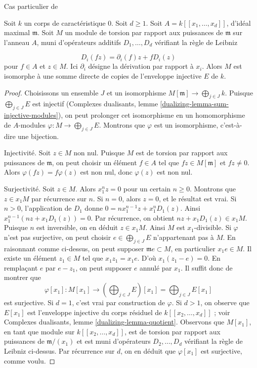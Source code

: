 \begin{lemma}
\label{lemma-structure-torsion-D-module-regular}
\begin{reference}
Cas particulier de \cite[Theorem 2.4]{Lyubeznik}
\end{reference}
Soit $k$ un corps de caractéristique $0$. Soit $d \geq 1$. Soit $A = k[[x_1, \ldots, x_d]]$, d'idéal maximal $\mathfrak m$. Soit $M$ un module de torsion par rapport aux puissances de $\mathfrak m$ sur l'anneau $A$, muni d'opérateurs additifs $D_1, \ldots, D_d$ vérifiant la règle de Leibniz

$$
D_i(fz) = \partial_i(f) z + f D_i(z)
$$
pour $f \in A$ et $z \in M$. Ici $\partial_i$ désigne la dérivation par rapport à $x_i$. Alors $M$ est isomorphe à une somme directe de copies de l'enveloppe injective $E$ de $k$.
\end{lemma}

\begin{proof}
Choisissons un ensemble $J$ et un isomorphisme $M[\mathfrak m] \to \bigoplus_{j \in J} k$. Puisque $\bigoplus_{j \in J} E$ est injectif (Complexes dualisants, lemme \ref{dualizing-lemma-sum-injective-modules}), on peut prolonger cet isomorphisme en un homomorphisme de $A$-modules $\varphi : M \to \bigoplus_{j \in J} E$. Montrons que $\varphi$ est un isomorphisme, c'est-à-dire une bijection.

\medskip\noindent
Injectivité. Soit $z \in M$ non nul. Puisque $M$ est de torsion par rapport aux puissances de $\mathfrak m$, on peut choisir un élément $f \in A$ tel que $fz \in M[\mathfrak m]$ et $fz \not = 0$. Alors $\varphi(fz) = f\varphi(z)$ est non nul, donc $\varphi(z)$ est non nul.

\medskip\noindent
Surjectivité. Soit $z \in M$. Alors $x_1^n z = 0$ pour un certain $n \geq 0$. Montrons que $z \in x_1M$ par récurrence sur $n$. Si $n = 0$, alors $z = 0$, et le résultat est vrai. Si $n > 0$, l'application de $D_1$ donne $0 = n x_1^{n - 1} z + x_1^nD_1(z)$. Ainsi $x_1^{n - 1}(nz + x_1D_1(z)) = 0$. Par récurrence, on obtient $nz + x_1D_1(z) \in x_1M$. Puisque $n$ est inversible, on en déduit $z \in x_1M$. Ainsi $M$ est $x_1$-divisible. Si $\varphi$ n'est pas surjective, on peut choisir $e \in \bigoplus_{j \in J} E$ n'appartenant pas à $M$. En raisonnant comme ci-dessus, on peut supposer $\mathfrak m e \subset M$, en particulier $x_1 e \in M$. Il existe un élément $z_1 \in M$ tel que $x_1 z_1 = x_1 e$. D'où $x_1(z_1 - e) = 0$. En remplaçant $e$ par $e - z_1$, on peut supposer $e$ annulé par $x_1$. Il suffit donc de montrer que
$$
\varphi[x_1] :
M[x_1]
\longrightarrow
\left(\bigoplus\nolimits_{j \in J} E\right)[x_1] =
\bigoplus\nolimits_{j \in J} E[x_1]
$$
est surjective. Si $d = 1$, c'est vrai par construction de $\varphi$. Si $d > 1$, on observe que $E[x_1]$ est l'enveloppe injective du corps résiduel de $k[[x_2, \ldots, x_d]]$ ; voir Complexes dualisants, lemme \ref{dualizing-lemma-quotient}. Observons que $M[x_1]$, en tant que module sur $k[[x_2, \ldots, x_d]]$, est de torsion par rapport aux puissances de $\mathfrak m/(x_1)$ et est muni d'opérateurs $D_2, \ldots, D_d$ vérifiant la règle de Leibniz ci-dessus. Par récurrence sur $d$, on en déduit que $\varphi[x_1]$ est surjective, comme voulu.
\end{proof}

